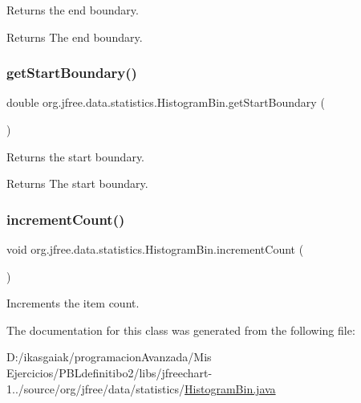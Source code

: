 Returns the end boundary.

\begin{DoxyReturn}{Returns}
The end boundary. 
\end{DoxyReturn}
\mbox{\label{classorg_1_1jfree_1_1data_1_1statistics_1_1_histogram_bin_a7d0a89c94a7ebebbf1ad5bb6f869aef1}} 
\subsubsection{\texorpdfstring{get\+Start\+Boundary()}{getStartBoundary()}}
{\footnotesize\ttfamily double org.\+jfree.\+data.\+statistics.\+Histogram\+Bin.\+get\+Start\+Boundary (\begin{DoxyParamCaption}{ }\end{DoxyParamCaption})}

Returns the start boundary.

\begin{DoxyReturn}{Returns}
The start boundary. 
\end{DoxyReturn}
\mbox{\label{classorg_1_1jfree_1_1data_1_1statistics_1_1_histogram_bin_a65d3151baaf469de0b2ac7e5567fdd1e}} 
\subsubsection{\texorpdfstring{increment\+Count()}{incrementCount()}}
{\footnotesize\ttfamily void org.\+jfree.\+data.\+statistics.\+Histogram\+Bin.\+increment\+Count (\begin{DoxyParamCaption}{ }\end{DoxyParamCaption})}

Increments the item count. 

The documentation for this class was generated from the following file\+:\begin{DoxyCompactItemize}
\item 
D\+:/ikasgaiak/programacion\+Avanzada/\+Mis Ejercicios/\+P\+B\+Ldefinitibo2/libs/jfreechart-\/1../source/org/jfree/data/statistics/\mbox{\hyperlink{_histogram_bin_8java}{Histogram\+Bin.\+java}}\end{DoxyCompactItemize}
